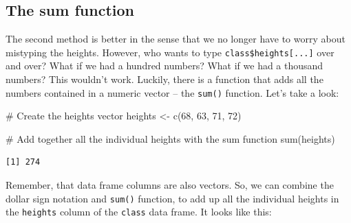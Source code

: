 \documentclass[
  letterpaper,
  DIV=11,
  numbers=noendperiod]{scrreprt}
\newenvironment{Shaded}{\begin{snugshade}}{\end{snugshade}}
\newcommand{\CommentTok}[1]{\textcolor[rgb]{0.37,0.37,0.37}{#1}}
\newcommand{\DecValTok}[1]{\textcolor[rgb]{0.68,0.00,0.00}{#1}}
\newcommand{\FunctionTok}[1]{\textcolor[rgb]{0.28,0.35,0.67}{#1}}
\newcommand{\NormalTok}[1]{\textcolor[rgb]{0.00,0.23,0.31}{#1}}
\newcommand{\OtherTok}[1]{\textcolor[rgb]{0.00,0.23,0.31}{#1}}
\newcommand{\SpecialCharTok}[1]{\textcolor[rgb]{0.37,0.37,0.37}{#1}}
\begin{document}
\subsection{The sum function}\label{the-sum-function}

The second method is better in the sense that we no longer have to worry
about mistyping the heights. However, who wants to type
\texttt{class\$heights{[}...{]}} over and over? What if we had a hundred
numbers? What if we had a thousand numbers? This wouldn't work. Luckily,
there is a function that adds all the numbers contained in a numeric
vector -- the \texttt{sum()} function. Let's take a look:

\begin{Shaded}
\begin{Highlighting}[]
\CommentTok{\# Create the heights vector}
\NormalTok{heights }\OtherTok{\textless{}{-}} \FunctionTok{c}\NormalTok{(}\DecValTok{68}\NormalTok{, }\DecValTok{63}\NormalTok{, }\DecValTok{71}\NormalTok{, }\DecValTok{72}\NormalTok{)}

\CommentTok{\# Add together all the individual heights with the sum function}
\FunctionTok{sum}\NormalTok{(heights)}
\end{Highlighting}
\end{Shaded}

\begin{verbatim}
[1] 274
\end{verbatim}

Remember, that data frame columns are also vectors. So, we can combine
the dollar sign notation and \texttt{sum()} function, to add up all the
individual heights in the \texttt{heights} column of the \texttt{class}
data frame. It looks like this:

\begin{Shaded}
\end{Shaded}
\end{document}
